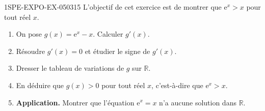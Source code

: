 \begin{exercice}{1SPE-EXPO-EX-050}{3}{15}
L'objectif de cet exercice est de montrer que $\mathrm{e}^x > x$ pour tout réel $x$.
\begin{enumerate}
\item On pose $g(x) = \mathrm{e}^x - x$. Calculer $g'(x)$.
\item Résoudre $g'(x) = 0$ et étudier le signe de $g'(x)$.
\item Dresser le tableau de variations de $g$ sur $\mathbb{R}$.
\item En déduire que $g(x) > 0$ pour tout réel $x$, c'est-à-dire que $\mathrm{e}^x > x$.
\item \textbf{Application.} Montrer que l'équation $\mathrm{e}^x = x$ n'a aucune solution dans $\mathbb{R}$.
\end{enumerate}
\end{exercice}
